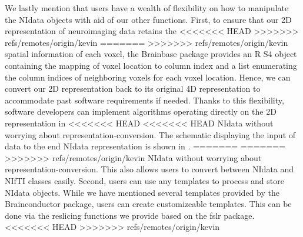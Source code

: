 \documentclass{nature}
\begin{document}
We lastly mention that users have a wealth of flexibility on how to manipulate the NIdata
objects with aid of our other functions. 
First, to ensure that our 2D representation of neuroimaging data retains the
<<<<<<< HEAD
>>>>>>> refs/remotes/origin/kevin
=======
>>>>>>> refs/remotes/origin/kevin
spatial information of each voxel, the Brainbase package provides
an R S4 object containing the mapping of voxel location to column index and
a list enumerating the column indices of neighboring voxels for each voxel
location. Hence, we can convert our 2D representation back to its original
4D representation to accommodate past software requirements if needed.
Thanks to this flexibility, software developers can
implement algorithms operating directly on the 2D representation in
<<<<<<< HEAD
<<<<<<< HEAD
NIdata without worrying about representation-conversion.  The
schematic displaying the input of data to the end NIdata representation
is shown in .
=======
=======
>>>>>>> refs/remotes/origin/kevin
NIdata without worrying about representation-conversion. This also allows users 
to convert between NIdata and NIfTI classes easily. Second, users can use any
templates to process and store NIdata objects. While we have mentioned several templates
provided by the Brainconductor package, users can create customizeable templates. 
This can be done via the reslicing
functions
we provide based on the fslr package. 
<<<<<<< HEAD
>>>>>>> refs/remotes/origin/kevin
\end{document}

